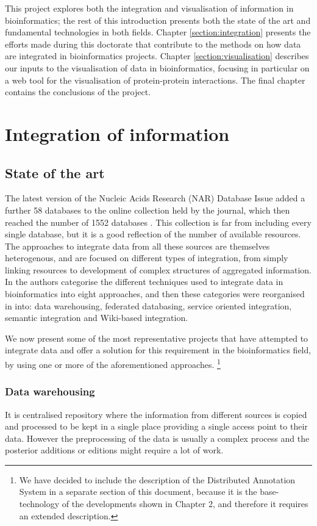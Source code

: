 This project explores both the integration and visualisation of information in bioinformatics; the rest of this introduction presents both the state of the art and fundamental technologies in both fields. Chapter \ref{section:integration} presents the efforts made during this doctorate that contribute to the methods on how data are integrated in bioinformatics projects. Chapter \ref{section:visualisation} describes our inputs to the visualisation of data in bioinformatics, focusing in particular on a web tool for the visualisation of protein-protein interactions. The final chapter contains the conclusions of the project.

\section{Integration of information}
\subsection{State of the art}
The latest version of the Nucleic Acids Research (NAR) Database Issue added a further 58 databases to the online collection held by the journal, which then reached the number of 1552 databases \cite{FER2014}. This collection is far from including every single database, but it is  a good reflection of the number of available resources.
The approaches to integrate data from all these sources are themselves heterogenous, and are focused on different types of integration, from simply linking resources to development of complex structures of aggregated information. In \cite{GOB2008} the authors categorise the different techniques used to integrate data in bioinformatics into eight approaches, and then these categories were reorganised in \cite{ZHA2011b} into: data warehousing, federated databasing, service oriented integration, semantic integration and Wiki-based integration.

We now present some of the most representative projects that have attempted to integrate data and offer a solution for this requirement in the bioinformatics field, by using one or more of the aforementioned approaches. \footnote{We have decided to include the description of the Distributed Annotation System in a separate section of this document, because it is the base-technology of the developments shown in Chapter 2, and therefore it requires an extended description.}

\subsubsection{Data warehousing} \label{subsec:dwh}
It is centralised repository where the information from different sources is copied and processed to be kept  in a single place providing a single access point to their data. However the preprocessing of the data is usually a complex process and the posterior additions or editions might require a lot of work.

